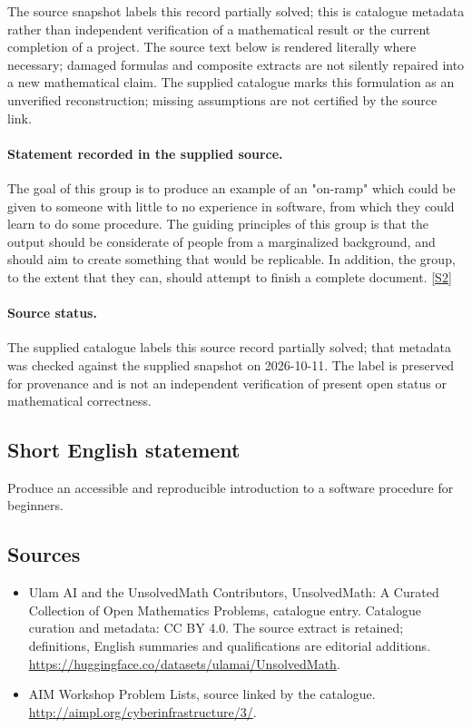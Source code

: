 \documentclass[11pt]{article}
\begin{document}
The source snapshot labels this record partially solved; this is catalogue metadata rather than independent verification of a mathematical result or the current completion of a project.
The source text below is rendered literally where necessary; damaged formulas and composite extracts are not silently repaired into a new mathematical claim.
The supplied catalogue marks this formulation as an unverified reconstruction; missing assumptions are not certified by the source link.
\paragraph{Statement recorded in the supplied source.}
The goal of this group is to produce an example of an "on-ramp" which could be given to someone with little to no experience in software, from which they could learn to do some procedure. The guiding principles of this group is that the output should be considerate of people from a marginalized background, and should aim to create something that would be replicable. In addition, the group, to the extent that they can, should attempt to finish a complete document. \href{http://aimpl.org/cyberinfrastructure/3/}{[S2]}
\paragraph{Source status.}
The supplied catalogue labels this source record partially solved; that metadata was checked against the supplied snapshot on 2026-10-11. The label is preserved for provenance and is not an independent verification of present open status or mathematical correctness.
\subsection{Short English statement}
Produce an accessible and reproducible introduction to a software procedure for beginners.
\subsection{Sources}
\begin{itemize}
\item[S1] Ulam AI and the UnsolvedMath Contributors, UnsolvedMath: A Curated Collection of Open Mathematics Problems, catalogue entry. Catalogue curation and metadata: CC BY 4.0. The source extract is retained; definitions, English summaries and qualifications are editorial additions.
\url{https://huggingface.co/datasets/ulamai/UnsolvedMath}.
\item[S2] AIM Workshop Problem Lists, source linked by the catalogue.
\url{http://aimpl.org/cyberinfrastructure/3/}.
\end{itemize}
\end{document}
